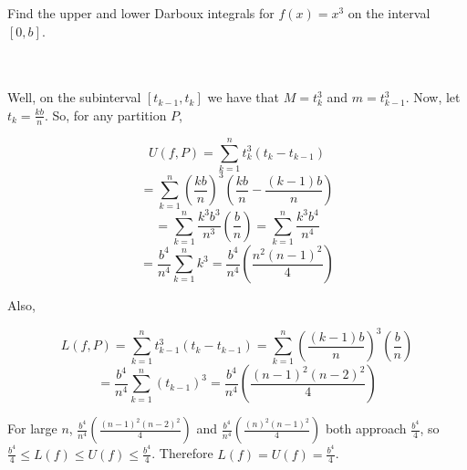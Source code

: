 Find the upper and lower Darboux integrals for $f(x)=x^3$ on the interval $[0,b]$.\\\\

\begin{solution}\renewcommand{\qedsymbol}{}\ \\
    Well, on the subinterval $[t_{k-1},t_k]$ we have that $M=t_k^3$ and $m=t_{k-1}^3$. Now, let
    $t_k=\frac{kb}{n}$. So, for any partition $P$,
    
    $$U(f,P)=\sum_{k=1}^nt_k^3(t_k-t_{k-1})$$
    $$=\sum_{k=1}^n(\frac{kb}{n})^3(\frac{kb}{n}-\frac{(k-1)b}{n})$$
    $$=\sum_{k=1}^n\frac{k^3b^3}{n^3}(\frac{b}{n})=\sum_{k=1}^n\frac{k^3b^4}{n^4}$$
    $$=\frac{b^4}{n^4}\sum_{k=1}^nk^3=\frac{b^4}{n^4}(\frac{n^2(n-1)^2}{4})$$
    
    Also,
    
    $$L(f,P)=\sum_{k=1}^nt_{k-1}^3(t_k-t_{k-1})=\sum_{k=1}^n(\frac{(k-1)b}{n})^3(\frac{b}{n})$$
    $$=\frac{b^4}{n^4}\sum_{k=1}^n(t_{k-1})^3=\frac{b^4}{n^4}(\frac{(n-1)^2(n-2)^2}{4})$$
    
    For large $n$, $\frac{b^4}{n^4}(\frac{(n-1)^2(n-2)^2}{4})$ and
    $\frac{b^4}{n^4}(\frac{(n)^2(n-1)^2}{4})$ both approach $\frac{b^4}{4}$, so
    $\frac{b^4}{4}\leq L(f)\leq U(f)\leq\frac{b^4}{4}$. Therefore $L(f)=U(f)=\frac{b^4}{4}$.

\end{solution}